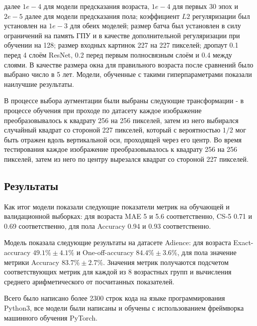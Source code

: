 далее $1e-4$ для модели предсказания возраста, $1e-4$ для первых 30 эпох и $2e-5$ далее для модели предсказания пола;
коэффициент $L2$ регуляризации был установлен на $1e-3$ для обеих моделей;
размер батча был установлен в силу ограничений на память ГПУ и в качестве дополнительной регуляризации при обучении на 128;
размер входных картинок 227 на 227 пикселей;
дропаут 0.1 перед 4 слоём ResNet, 0.2 перед первым полносвязным слоём и 0.4 между слоями.
В качестве размера окна для правильного возраста после сравнений было выбрано число в 5 лет.
Модели, обученные с такими гиперпараметрами показали наилучшие результаты.
\par В процессе выбора аугментации были выбраны следующие трансформации -
в процессе обучения при проходе по датасету каждое изображение преобразовывалось к квадрату 256 на 256 пикселей,
затем из него выбирался случайный квадрат со стороной 227 пикселей,
который с вероятностью $1/2$ мог быть отражен вдоль вертикальной оси, проходящей через его центр.
Во время тестирования каждое изображение преобразовывалось к квадрату 256 на 256 пикселей,
затем из него по центру вырезался квадрат со стороной 227 пикселей.

\subsection{Результаты}\label{subsec:результаты}
Как итог модели показали следующие показатели метрик на обучающей и валидационной выборках: для возраста MAE 5 и 5.6 соответственно,
CS-5 0.71 и 0.69 соответственно, для пола Accuracy 0.94 и 0.93 соответственно.
\par Модель показала следующие результаты на датасете Adience: для возраста Exact-accuracy $49.1\% \pm 4.1 \%$ и One-off-accuracy $84.4\% \pm 3.6 \%$,
для пола значение метрики Accuracy $83.7\% \pm 2.7\%$.
Значения метрик получаются подсчетом соответствующих метрик для каждой из 8 возрастных групп
и вычисления среднего арифметического от посчитанных показателей.
\par Всего было написано более 2300 строк кода на языке программирования Python3,
все модели были написаны и обучены с использованием фреймворка машинного обучения PyTorch.